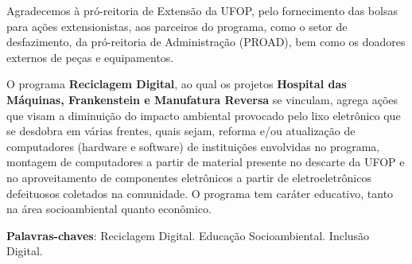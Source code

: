 \documentclass[
	12pt,				%
	openright,			%
	oneside,			%
	a4paper,			%
	english,			%
	spanish,			%
	brazil,				%
	]{abntex2}
\begin{document}
\begin{agradecimentos}
Agradecemos à pró-reitoria de Extensão da UFOP, pelo fornecimento das bolsas para ações extensionistas, aos parceiros do programa, como o setor de desfazimento, da pró-reitoria de Administração (PROAD), bem como os doadores externos de peças e equipamentos.
\end{agradecimentos}


\setlength{\absparsep}{18pt} %
\begin{resumo}
O programa \textbf{Reciclagem Digital}, ao qual os projetos \textbf{Hospital das Máquinas, Frankenstein e Manufatura Reversa} se vinculam, agrega ações que visam a diminuição do impacto ambiental provocado pelo lixo eletrônico que se desdobra em várias frentes, quais sejam, reforma e/ou atualização de computadores (hardware e software) de instituições envolvidas no programa, montagem de computadores a partir de material presente no descarte da UFOP e no aproveitamento de componentes eletrônicos a partir de eletroeletrônicos defeituosos coletados na comunidade. O programa tem caráter educativo, tanto na área socioambiental quanto econômico.

 \noindent
 \textbf{Palavras-chaves}: Reciclagem Digital. Educação Socioambiental. Inclusão Digital.
\end{resumo}
\cleardoublepage



\end{document}
